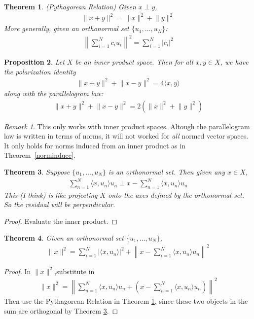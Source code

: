\documentclass[12pt]{article}
\theoremstyle{plain}
\newtheorem{thm}{Theorem}[section]
\newtheorem{prop}[thm]{Proposition}
\theoremstyle{definition}
\theoremstyle{remark}
\newtheorem*{rmk}{Remark}
\begin{document}
\begin{thm}
\label{pythag}
\emph{(Pythagorean Relation)} Given $x\perp y$,
\begin{align*}
    \lVert x + y\rVert^2 = \lVert x\rVert^2 + \lVert y \rVert^2
\end{align*}
More generally, given an orthonormal set $\{u_1,\ldots,u_N\}$:
\begin{align*}
    \left\lVert \sum_{i=1}^N c_i u_i \right\rVert^2
    = \sum_{i=1}^N |c_i|^2
\end{align*}
\end{thm}

\begin{prop}
Let $X$ be an inner product space. Then for all $x,y\in X$, we have the
\emph{polarization identity}
\begin{align*}
    \lVert x+y\rVert^2 + \lVert x-y\rVert^2
    = 4\langle x,y\rangle
\end{align*}
along with the \emph{parallelogram law}:
\begin{align*}
  \lVert x+y\rVert^2 + \lVert x-y\rVert^2
  =2\left(\lVert x\rVert^2 +\lVert y\rVert^2\right)
\end{align*}
\end{prop}
\begin{rmk}
This only works with inner product spaces. Altough the parallelogram law
is written in terms of norms, it will not worked for \emph{all} normed
vector spaces. It only holds for norms induced from an inner product as
in Theorem~\ref{norminduce}.
\end{rmk}

\begin{thm}
\label{projorth}
Suppose $\{u_1,\ldots,u_N\}$ is an orthonormal set. Then given any
$x\in X$,
\begin{align*}
    \sum_{n=1}^N \langle x,u_n\rangle u_n
    \perp
    x -\sum_{n=1}^N \langle x,u_n\rangle u_n
\end{align*}
This (I think) is like projecting $X$ onto the axes defined by the
orthonormal set. So the residual will be perpendicular.
\end{thm}
\begin{proof}
Evaluate the inner product.
\end{proof}

\begin{thm}
Given an orthonormal set $\{u_1,\ldots,u_N\}$,
\begin{align*}
  \lVert x\rVert^2 =
  \sum_{i=1}^N \bigl\lvert\langle x,u_n\rangle\bigr\rvert^2
  + \left\lVert x -  \sum_{i=1}^N\langle x,u_n\rangle u_n \right\rVert^2
\end{align*}
\end{thm}
\begin{proof}
In $\lVert x\rVert^2$,substitute in
\begin{align*}
  \lVert x\rVert^2 =
  \left\lVert
  \sum_{n=1}^N \langle x,u_n\rangle u_n
  + \left( x
  -\sum_{n=1}^N \langle x,u_n\rangle u_n\right)
  \right\rVert^2
\end{align*}
Then use the Pythagorean Relation in Theorem \ref{pythag}, since these
two objects in the sum are orthogonal by Theorem \ref{projorth}.
\end{proof}
\end{document}
